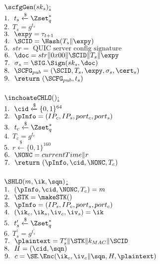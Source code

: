 \noindent
\underline{$\scfgGen(sk_s)$:} \\
 $1.\ \ t_s \xleftarrow{\$} \Zset_{q}^{\ast}$ \\
 $2.\ \ T_s = g^{t_s}$ \\
 $3.\ \ \expy = \tau_{t+1}$ \\
 $4.\ \ \SCID = \Hash(T_s \| \expy)$ \\
 $5.\ \ str = \text{ QUIC server config signature }$ \\
 $6.\ \ \doc = str \| 0x00 \| \SCID \| T_s \| \expy$ \\
 $7.\ \ \sigma_s = \SIG.\Sign(sk_s, \doc)$ \\
 $8.\ \ \SCFG_{pub} = (\SCID, T_s, \expy, \sigma_s, \cert_s)$ \\
 $9.\ \ \return\ (\SCFG_{pub}, t_s)$ \\
\\
\underline{$\inchoateCHLO()$:} \\
 $1.\ \ \cid \xleftarrow{\$} \{0,1\}^{64} $ \\
 $2.\ \ \pInfo = (IP_c, IP_s, port_c, port_s)$ \\
 $3.\ \ t_c \xleftarrow{\$} \Zset_{q}^{\ast}$ \\
 $4.\ \ T_c = g^{t_c}$ \\
 $5.\ \ r \xleftarrow{\$} \{0,1\}^{160}$ \\
 $6.\ \ \NONC = currentTime \| r$ \\
 $7.\ \ \return\ (\pInfo, \cid, \NONC, T_c)$ \\
\\
\underline{$\SHLO(m, \ik, \sqn)$:} \\
 $1.\ \ (\pInfo, \cid, \NONC, T_c) = m$ \\
 $2.\ \ \STK = \makeSTK()$ \\
 $3.\ \ \pInfo = (IP_s, IP_c, port_s, port_c)$ \\
 $4.\ \ (\ik_c, \ik_s, \iv_c, \iv_s) = \ik$ \\
 $5.\ \ t_s^{\prime} \xleftarrow{\$} \Zset_{q}^{\ast}$ \\
 $6.\ \ T_s^{\prime} = g^{t_s^{\prime}}$ \\
 $7.\ \ \plaintext = T_{s}^{\prime} \| \STK \| k_{MAC} \| \SCID$\\
 $8.\ \ H = (\cid, \sqn)$ \\
 $9.\ \ c = \SE.\Enc(\ik_c, \iv_c \| \sqn, H, \plaintext)$ \\
